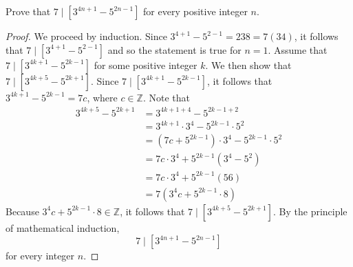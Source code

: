 \documentclass[12pt]{article}
\newcommand{\Z}{\mathbb{Z}}
\newenvironment{problem}[2][Problem]{\begin{trivlist}
		\item[\hskip \labelsep {\bfseries #1}\hskip \labelsep {\bfseries #2.}]}{\end{trivlist}}
\begin{document}
\begin{problem}{16}
	Prove that $7\mid [3^{4n+1}-5^{2n-1}]$ for every positive integer $n$.
	\begin{proof}
		We proceed by induction. Since $3^{4+1}-5^{2-1} = 238 =7(34)$, it follows that $7\mid [3^{4+1}-5^{2-1}]$ and so the statement is true for $n=1$. Assume that $7\mid [3^{4k+1}-5^{2k-1}]$ for some positive integer $k$. We then show that $7\mid [3^{4k+5}-5^{2k+1}]$. Since $7\mid [3^{4k+1}-5^{2k-1}]$, it follows that $3^{4k+1}-5^{2k-1} = 7c$, where $c\in \Z$. Note that
		\begin{align*}
			3^{4k+5}-5^{2k+1} &= 3^{4k+1+4} - 5^{2k-1+2} \\
			&= 3^{4k+1}\cdot 3^{4} - 5^{2k-1}\cdot 5^{2}\\
			&= (7c+5^{2k-1})\cdot 3^{4} - 5^{2k-1}\cdot 5^{2}\\
			&= 7c\cdot 3^{4} + 5^{2k-1}(3^{4}-5^{2}) \\
			&= 7c\cdot 3^{4} + 5^{2k-1}(56) \\
			&= 7(3^{4}c+5^{2k-1}\cdot8)
		\end{align*}
	Because $3^{4}c+5^{2k-1}\cdot8 \in \Z$, it follows that $7\mid [3^{4k+5}-5^{2k+1}]$. By the principle of mathematical induction,
	\begin{equation*}
		7\mid [3^{4n+1}-5^{2n-1}]
	\end{equation*}
	for every integer $n$.  
	\end{proof}
\end{problem}
\end{document}
